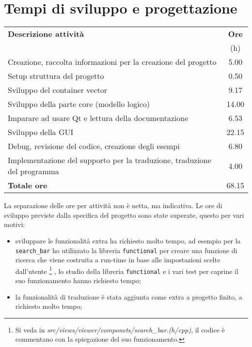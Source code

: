 \documentclass[a4paper,10pt]{article}
\begin{document}
\section {Tempi di sviluppo e progettazione}
\begin{tabular}{lS}
\toprule
\textbf{Descrizione attività} & \textbf{{Ore}} \\
                              &       {(h)}    \\
\midrule
Creazione, raccolta informazioni per la creazione del progetto      & 5.00  \\
Setup struttura del progetto                                        & 0.50  \\
Sviluppo del container vector                                       & 9.17  \\
Sviluppo della parte core (modello logico)                          & 14.00 \\
Imparare ad usare Qt e lettura della documentazione                 & 6.53  \\
Sviluppo della GUI                                                  & 22.15 \\
Debug, revisione del codice, creazione degli esempi                 & 6.80  \\
Implementazione del supporto per la traduzione, traduzione del
programma                                                           & 4.00  \\
\midrule
\textbf{Totale ore}                                                 & 68.15 \\
\bottomrule
\end{tabular}
\newline

La separazione delle ore per attività non è netta, ma indicativa. Le ore di sviluppo previste dalla specifica del progetto sono state superate, questo per vari motivi:
\begin{itemize}
\item sviluppare le funzionalità extra ha richiesto molto tempo, ad esempio per la \texttt{search\_bar} ho utilizzato la libreria \texttt{functional} per creare una funzione di ricerca che viene costruita a run-time in base alle impostazioni scelte dall'utente%
\footnote{Si veda in \emph{src/views/viewer/componets/search\_bar.(h/cpp)}, il codice è commentano con la spiegazione del suo funzionamento.}%
, lo studio della libreria \texttt{functional} e i vari test per caprine il suo funzionamento hanno richiesto tempo;
\item la funzionalità di traduzione è stata aggiunta come extra a progetto finito, a richiesto molto tempo;
\end{itemize}
\end{document}
